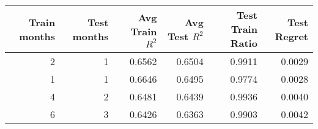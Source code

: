 \begin{tabular}{rrrrrr}
\toprule
 Train months &  Test months &  Avg Train $R^2$ &  Avg Test $R^2$ &  Test Train Ratio &  Test Regret \\
\midrule
            2 &            1 &           0.6562 &          0.6504 &            0.9911 &       0.0029 \\
            1 &            1 &           0.6646 &          0.6495 &            0.9774 &       0.0028 \\
            4 &            2 &           0.6481 &          0.6439 &            0.9936 &       0.0040 \\
            6 &            3 &           0.6426 &          0.6363 &            0.9903 &       0.0042 \\
\bottomrule
\end{tabular}
